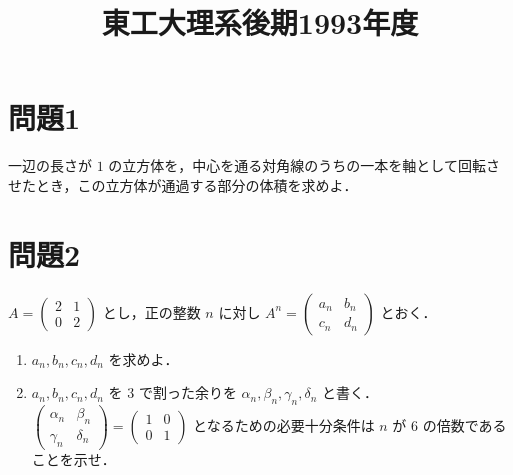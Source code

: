 \documentclass[unicode,12pt, a4paper]{ltjsarticle}%
\title{東工大理系後期1993年度}
\begin{document}
\maketitle
\section{問題1}
一辺の長さが $1$ の立方体を，中心を通る対角線のうちの一本を軸として回転させたとき，この立方体が通過する部分の体積を求めよ．

\section{問題2}
$A=\begin{pmatrix} 2 & 1 \\ 0 & 2 \end{pmatrix}$ とし，正の整数 $n$ に対し $A^n = \begin{pmatrix} a_n & b_n \\ c_n & d_n \end{pmatrix}$ とおく．
    \begin{enumerate}
        \item $a_n, b_n, c_n, d_n$ を求めよ．
        \item $a_n, b_n, c_n, d_n$ を $3$ で割った余りを $\alpha_n, \beta_n, \gamma_n, \delta_n$ と書く．
        $\begin{pmatrix} \alpha_n & \beta_n \\ \gamma_n & \delta_n \end{pmatrix} = \begin{pmatrix} 1 & 0 \\ 0 & 1 \end{pmatrix}$ となるための必要十分条件は $n$ が $6$ の倍数であることを示せ．
    \end{enumerate}
\end{document}
